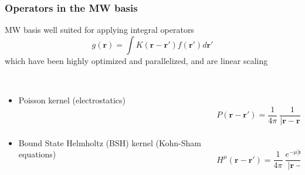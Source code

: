 \documentclass[mathserif]{beamer}
\begin{document}
\begin{frame}
    \frametitle{Operators in the MW basis}
    MW basis well suited for applying integral operators
    \begin{equation}
	\nonumber
	g(\boldsymbol{r}) = \int K(\boldsymbol{r} - \boldsymbol{r'}) 
	    f(\boldsymbol{r'}) d\boldsymbol{r'}
    \end{equation}
    which have been highly optimized and parallelized, and are linear scaling
    \ \\
    \ \\
    \pause
    \begin{columns}
    \begin{column}{.48\textwidth}
    \begin{itemize}
	\item Poisson kernel (electrostatics)
	    \ \\
	    \ \\
	    \ \\
	\item Bound State Helmholtz (BSH) kernel (Kohn-Sham equations)
    \end{itemize}
    \end{column}
    \begin{column}{.48\textwidth}
    \ \\
    \begin{equation}
	\nonumber
	P(\boldsymbol{r}-\boldsymbol{r}') = 
	    \frac{1}{4\pi}\ \frac{1}{|\boldsymbol{r}-\boldsymbol{r}'|}
    \end{equation}
    \ \\
    \ \\
    \begin{equation}
	\nonumber
	H^{\mu}(\boldsymbol{r}-\boldsymbol{r}') = \frac{1}{4\pi}\ 
	    \frac{e^{-\mu |\boldsymbol{r}-\boldsymbol{r}'|}}{|\boldsymbol{r}-\boldsymbol{r}'|}
    \end{equation}
    \end{column}
    \end{columns}
\end{frame}
\end{document}
